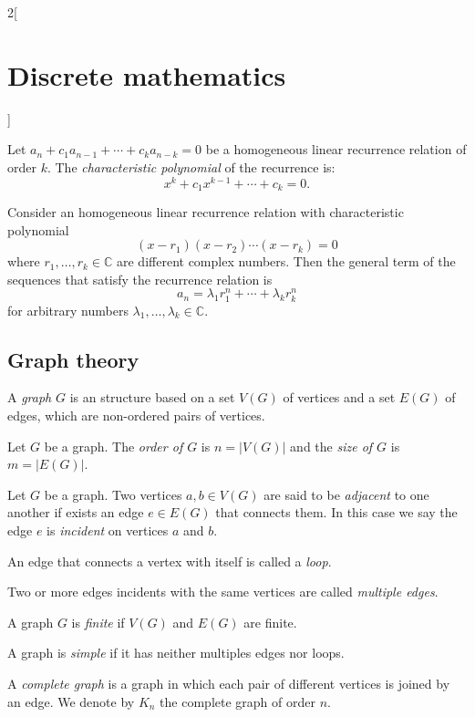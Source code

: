 \documentclass[../../../main.tex]{subfiles}
\begin{document}
\begin{multicols}{2}[\section{Discrete mathematics}]
\begin{definition}
Let $a_n+c_1a_{n-1}+\cdots+c_ka_{n-k}=0$ be a homogeneous linear recurrence relation of order $k$. The \textit{characteristic polynomial} of the recurrence is: $$x^k+c_1x^{k-1}+\cdots+c_k=0.$$
\end{definition}
\begin{prop}
Consider an homogeneous linear recurrence relation with characteristic polynomial $$(x-r_1)(x-r_2)\cdots(x-r_k)=0$$ where $r_1,\ldots,r_k\in\mathbb{C}$ are different complex numbers. Then the general term of the sequences that satisfy the recurrence relation is $$a_n=\lambda_1r_1^n+\cdots+\lambda_kr_k^n$$ for arbitrary numbers $\lambda_1,\ldots,\lambda_k\in\mathbb{C}$.
\end{prop}
\subsection{Graph theory}
\begin{definition}
A \textit{graph} $G$ is an structure based on a set $V(G)$ of vertices and a set $E(G)$ of edges, which are non-ordered pairs of vertices.
\end{definition}
\begin{definition}
Let $G$ be a graph. The \textit{order of $G$} is $n=|V(G)|$ and the \textit{size of $G$} is $m=|E(G)|$.
\end{definition}
\begin{definition}
Let $G$ be a graph. Two vertices $a,b\in V(G)$ are said to be \textit{adjacent} to one another if exists an edge $e\in E(G)$ that connects them. In this case we say the edge $e$ is \textit{incident} on vertices $a$ and $b$.
\end{definition}
\begin{definition}
An edge that connects a vertex with itself is called a \textit{loop}.
\end{definition}
\begin{definition}
Two or more edges incidents with the same vertices are called \textit{multiple edges}.
\end{definition}
\begin{definition}
A graph $G$ is \textit{finite} if $V(G)$ and $E(G)$ are finite.
\end{definition}
\begin{definition}
A graph is \textit{simple} if it has neither multiples edges nor loops.
\end{definition}
\begin{definition}
A \textit{complete graph} is a graph in which each pair of different vertices is joined by an edge. We denote by $K_n$ the complete graph of order $n$.

\end{definition}
\end{multicols}
\end{document}
